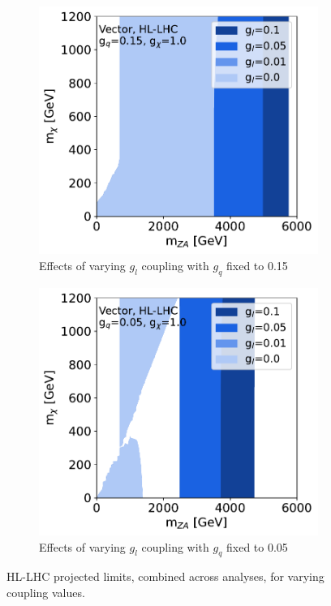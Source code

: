 \documentclass[11pt]{article}
\begin{document}
\begin{figure}
     \begin{subfigure}[b]{0.49\textwidth}
         \centering
         \includegraphics[width=\textwidth]{SummaryPlots-EF10/figures/massmass/hl-lhc/massmass_vector_gq0.15_gdm1.0.pdf}
         \caption{Effects of varying $g_l$ coupling with $g_q$ fixed to 0.15}
         \label{subfig:vector-hl-lhc-glvariations1}
     \end{subfigure}
     \hfill
     \begin{subfigure}[b]{0.49\textwidth}
         \centering
         \includegraphics[width=\textwidth]{SummaryPlots-EF10/figures/massmass/hl-lhc/massmass_vector_gq0.05_gdm1.0.pdf}
         \caption{Effects of varying $g_l$ coupling with $g_q$ fixed to 0.05}
         \label{subfig:vector-hl-lhc-glvariations2}       
     \end{subfigure}
        \caption{HL-LHC projected limits, combined across analyses, for varying coupling values.}
        \label{fig:hl-lhc-massmass-combined}
\end{figure}
\end{document}
